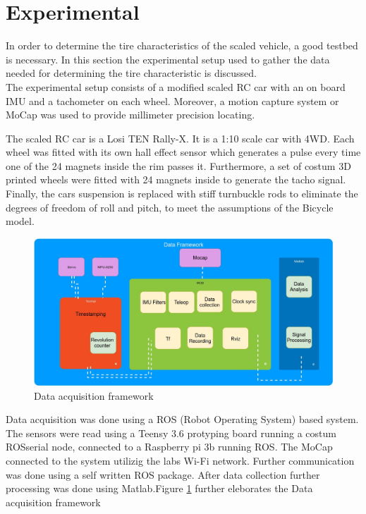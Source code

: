 \section{Experimental}
 

In order to determine the tire characteristics of the scaled vehicle, a good testbed is necessary. In this section the experimental setup used to gather the data needed for determining the tire characteristic is discussed.\\
The experimental setup consists of a modified scaled RC car with an on board IMU and a tachometer on each wheel. Moreover, a motion capture system or MoCap was used to provide millimeter precision locating. 

The scaled RC car is a Losi TEN Rally-X. It is a 1:10 scale car with 4WD.  
Each wheel was fitted with it\textquotesingle s own hall effect sensor which generates a pulse every time one of the 24 magnets inside the rim passes it. Furthermore, a set of costum 3D printed wheels were fitted with 24 magnets inside to generate the tacho signal.  Finally, the car\textquotesingle s suspension is replaced with stiff turnbuckle rods to eliminate the degrees of freedom of roll and pitch, to meet the assumptions of the Bicycle model.

\begin{figure}
  \centering
    \includegraphics[scale=0.22]{figure/DataFramework}
  \caption{Data acquisition framework}
  \label{fig:DonutFramework} 
\end{figure}

Data acquisition was done using a ROS (Robot Operating System) based system. The sensors were read using a Teensy 3.6 protyping board running a costum ROSserial node, connected to a Raspberry pi 3b running ROS. The MoCap connected to the system utilizig the labs Wi-Fi network. Further communication was done using a self written ROS package. After data collection further processing was done using Matlab.Figure
\ref{fig:DonutFramework} further eleborates the Data acquisition framework

